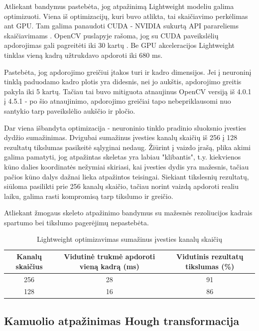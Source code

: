 \documentclass{VUMIFPSbakalaurinis}
\begin{document}
Atliekant bandymus pastebėta, jog atpažinimą Lightweight modeliu galima optimizuoti. Viena iš optimizacijų, kuri buvo atlikta, tai skaičiavimo perkėlimas ant GPU. Tam galima panaudoti CUDA - NVIDIA sukurtą API parareliems skaičiavimams \cite{cuda}. OpenCV puslapyje rašoma, jog su CUDA paveikslėlių apdorojimas gali pagreitėti iki 30 kartų \cite{opencv-cuda}. Be GPU akceleracijos Lightweight tinklas vieną kadrą užtrukdavo apdoroti iki 680 ms. 

Pastebėta, jog apdorojimo greičiui įtakos turi ir kadro dimensijos. Jei į neuroninį tinklą paduodamo kadro plotis yra didesnis, nei jo aukštis, apdorojimo greitis pakyla iki 5 kartų. Tačiau tai buvo mitiguota atnaujinus OpenCV versiją iš 4.0.1 į 4.5.1 - po šio atnaujinimo, apdorojimo greičiai tapo nebepriklausomi nuo santykio tarp paveikslėlio aukščio ir pločio. 

Dar viena išbandyta optimizacija - neuroninio tinklo pradinio sluoksnio įvesties dydžio sumažinimas. Dvigubai sumažinus įvesties kanalų skaičių iš 256 į 128 rezultatų tikslumas pasikeitė sąlyginai nedaug. Žiūrint į vaizdo įrašą, plika akimi galima pamatyti, jog atpažintas skeletas yra labiau "klibantis", t.y. kiekvienos kūno dalies koordinatės nežymiai skiriasi, kai įvesties dydis yra mažesnis, tačiau pačios kūno dalys dažnai lieka atpažintos teisingai. Siekiant tikslesnių rezultatų, siūloma pasilikti prie 256 kanalų skaičio, tačiau norint vaizdą apdoroti realiu laiku, galima rasti kompromisą tarp tikslumo ir greičio. 

Atliekant žmogaus skeleto atpažinimo bandymus su mažesnės rezoliucijos kadrais spartumo bei tikslumo pagerėjimų nepastebėta.

\begin{table}[H]\footnotesize
	\centering
	\caption{Lightweight optimizavimas sumažinus įvesties kanalų skaičių}
	{\begin{tabular}{|c|c|c|} \hline
			\textbf{Kanalų skaičius} & \textbf{Vidutinė trukmė apdoroti vieną kadrą (ms)} & \textbf{Vidutinis rezultatų tikslumas (\%)} \\
			\hline
			256  & 28    & 91       \\
			\hline
			128  & 16    & 86       \\
			\hline
	\end{tabular}}
	\label{tab:openposevslightweight}
\end{table}

\subsection{Kamuolio atpažinimas Hough transformacija}
\end{document}
